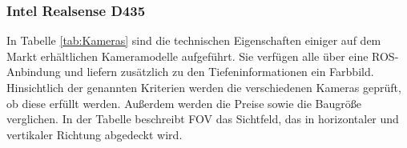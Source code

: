

\subsubsection{Intel Realsense D435}

In Tabelle \ref{tab:Kameras} sind die technischen Eigenschaften einiger auf dem Markt erhältlichen Kameramodelle aufgeführt. Sie verfügen alle über eine ROS-Anbindung und liefern zusätzlich zu den Tiefeninformationen ein Farbbild. Hinsichtlich der genannten Kriterien werden die verschiedenen Kameras geprüft, ob diese erfüllt werden. Außerdem werden die Preise sowie die Baugröße verglichen. In der Tabelle beschreibt FOV das Sichtfeld, das in horizontaler und vertikaler Richtung abgedeckt wird. 

